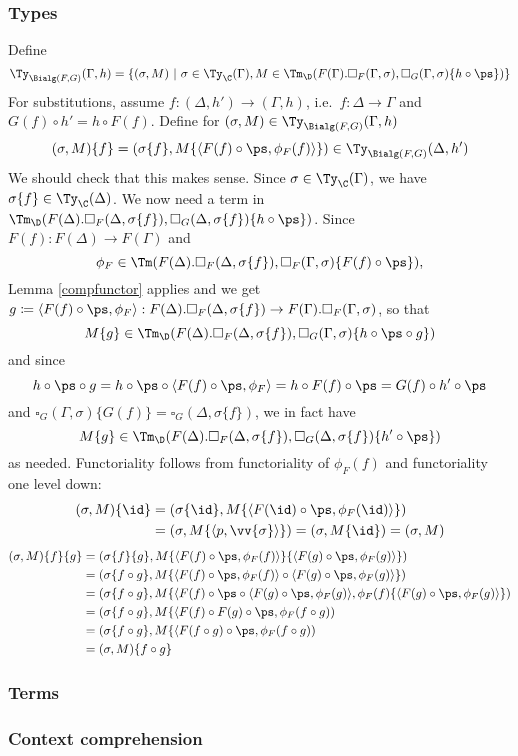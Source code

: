 \documentclass{article}
\newcommand{\isoFL}{\ensuremath{\phi_{F}}} %
\begin{document}
\subsubsection{Types}

Define
\[
\Ty_{\Bialg(F, G)}(\Gamma, h) = \{ (\sigma, M)\ |\ \sigma \in \Ty_{\C}(\Gamma),
 M \in \Tm_\D(F(\Gamma).\square_F(\Gamma, \sigma),\square_G(\Gamma, \sigma)\{h \circ \ps\})\}
\]
For substitutions, assume $f : (\Delta, h') \to (\Gamma, h)$, i.e.\ $f
: \Delta \to \Gamma$ and $G(f) \circ h' = h \circ F(f)$. Define for $(\sigma, M) \in \Ty_{\Bialg(F, G)}(\Gamma, h)$
\[
(\sigma, M)\{f\} = (\sigma\{f\}, M\{\langle F(f) \circ \ps, \isoFL(f)\rangle\}) \in \Ty_{\Bialg(F, G)}(\Delta, h')
\]
%
We should check that this makes sense. Since $\sigma \in
\Ty_{\C}(\Gamma)$, we have $\sigma\{f\} \in \Ty_{\C}(\Delta)$. We now
need a term in $\Tm_\D(F(\Delta).\square_F(\Delta,
\sigma\{f\}),\square_G(\Delta, \sigma\{f\})\{h \circ \ps\})$.  Since
$F(f) : F(\Delta) \to F(\Gamma)$ and
\[
\isoFL \in \Tm(F(\Delta).\square_F(\Delta, \sigma\{f\}),
\square_F(\Gamma, \sigma)\{F(f) \circ \ps\}),
\]
Lemma \ref{compfunctor} applies and we get $g \coloneqq \langle F(f) \circ \ps,
\isoFL\rangle : F(\Delta).\square_F(\Delta, \sigma\{f\}) \to
F(\Gamma).\square_F(\Gamma, \sigma)$, so that
\[
M\{g\} \in
\Tm_\D(F(\Delta).\square_F(\Delta, \sigma\{f\}),\square_G(\Gamma,
\sigma)\{h \circ \ps \circ g\})
\]
and since
\[
h \circ \ps \circ g = h \circ \ps \circ \langle F(f) \circ \ps,
\isoFL\rangle = h \circ F(f) \circ \ps = G(f) \circ h' \circ \ps
\]
and $\square_G(\Gamma, \sigma)\{G(f)\} = \square_G(\Delta,
\sigma\{f\})$, we in fact have
\[
M\{g\} \in \Tm_\D(F(\Delta).\square_F(\Delta,
\sigma\{f\}),\square_G(\Delta, \sigma\{f\})\{h' \circ \ps\})
\]
as needed.
Functoriality follows from functoriality of $\isoFL(f)$ and functoriality one level down:
\begin{align*}
(\sigma, M)\{\id\} &= (\sigma\{\id\}, M\{\langle F(\id) \circ \ps, \isoFL(\id)\rangle\}) \\ &=
  (\sigma, M\{\langle p, \vv{\sigma}\rangle\}) = (\sigma, M\{\id\}) = (\sigma, M)
\end{align*}
\begin{align*}
  (\sigma, M)\{f\}\{g\} 
  &= (\sigma\{f\}\{g\}, M\{\langle F(f) \circ \ps, \isoFL(f)\rangle\}\{\langle F(g) \circ \ps, \isoFL(g)\rangle\}) \\
  &= (\sigma\{f \circ g\}, M\{\langle F(f) \circ \ps, \isoFL(f)\rangle \circ \langle F(g) \circ \ps, \isoFL(g)\rangle\}) \\
  &= (\sigma\{f \circ g\}, M\{\langle F(f) \circ \ps \circ \langle F(g) \circ \ps, \isoFL(g)\rangle, \isoFL(f)\{\langle F(g) \circ \ps, \isoFL(g)\rangle\}) \\
  &= (\sigma\{f \circ g\}, M\{\langle F(f) \circ F(g) \circ \ps, \isoFL(f \circ g)) \\
  &= (\sigma\{f \circ g\}, M\{\langle F(f \circ g) \circ \ps, \isoFL(f \circ g)) \\
  &= (\sigma, M)\{f \circ g\}
\end{align*}


\subsubsection{Terms}


\subsubsection{Context comprehension}




\end{document}
